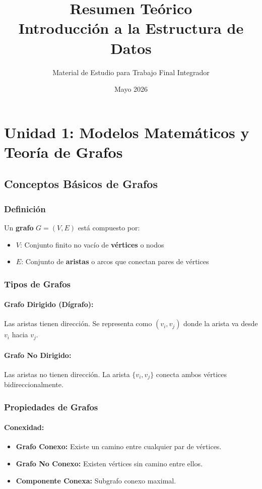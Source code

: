\documentclass[12pt,a4paper]{article}
\title{\textbf{Resumen Teórico\\Introducción a la Estructura de Datos}}
\author{Material de Estudio para Trabajo Final Integrador}
\date{Mayo 2026}
\begin{document}
\maketitle
\newpage

\section{Unidad 1: Modelos Matemáticos y Teoría de Grafos}

\subsection{Conceptos Básicos de Grafos}

\subsubsection{Definición}
Un \textbf{grafo} $G = (V, E)$ está compuesto por:
\begin{itemize}
    \item $V$: Conjunto finito no vacío de \textbf{vértices} o nodos
    \item $E$: Conjunto de \textbf{aristas} o arcos que conectan pares de vértices
\end{itemize}

\subsubsection{Tipos de Grafos}

\paragraph{Grafo Dirigido (Dígrafo):}
Las aristas tienen dirección. Se representa como $(v_i, v_j)$ donde la arista va desde $v_i$ hacia $v_j$.

\paragraph{Grafo No Dirigido:}
Las aristas no tienen dirección. La arista $\{v_i, v_j\}$ conecta ambos vértices bidireccionalmente.

\subsubsection{Propiedades de Grafos}

\paragraph{Conexidad:}
\begin{itemize}
    \item \textbf{Grafo Conexo:} Existe un camino entre cualquier par de vértices.
    \item \textbf{Grafo No Conexo:} Existen vértices sin camino entre ellos.
    \item \textbf{Componente Conexa:} Subgrafo conexo maximal.
\end{itemize}
\end{document}
